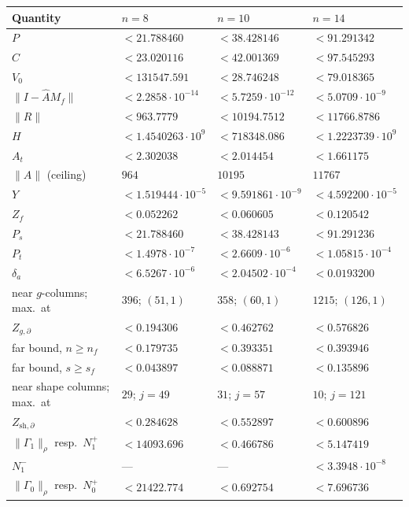 \documentclass[11pt]{amsart}
\theoremstyle{definition}
\theoremstyle{remark}
\numberwithin{equation}{section}
\newcommand{\nrm}[1]{\lVert #1\rVert}
\begin{document}
\begin{table}[tp]
\centering
\footnotesize
\begin{tabular}{@{}llll@{}}
\toprule
Quantity & $n=8$ & $n=10$ & $n=14$\\
\midrule
$P$ & $<21.788460$ & $<38.428146$ & $<91.291342$\\
$C$ & $<23.020116$ & $<42.001369$ & $<97.545293$\\
$V_0$ & $<131547.591$ & $<28.746248$ & $<79.018365$\\
$\nrm{I-\widehat AM_f}$ & $<2.2858\cdot10^{-14}$ & $<5.7259\cdot10^{-12}$ & $<5.0709\cdot10^{-9}$\\
$\nrm R$ & $<963.7779$ & $<10194.7512$ & $<11766.8786$\\
$H$ & $<1.4540263\cdot10^9$ & $<718348.086$ & $<1.2223739\cdot10^9$\\
$A_t$ & $<2.302038$ & $<2.014454$ & $<1.661175$\\
$\nrm A$ (ceiling) & $964$ & $10195$ & $11767$\\
\midrule
$Y$ & $<1.519444\cdot10^{-5}$ & $<9.591861\cdot10^{-9}$ & $<4.592200\cdot10^{-5}$\\
$Z_f$ & $<0.052262$ & $<0.060605$ & $<0.120542$\\
$P_s$ & $<21.788460$ & $<38.428143$ & $<91.291236$\\
$P_t$ & $<1.4978\cdot10^{-7}$ & $<2.6609\cdot10^{-6}$ & $<1.05815\cdot10^{-4}$\\
$\delta_a$ & $<6.5267\cdot10^{-6}$ & $<2.04502\cdot10^{-4}$ & $<0.0193200$\\
near $g$-columns; max.\ at & $396$; $(51,1)$ & $358$; $(60,1)$ & $1215$; $(126,1)$\\
$Z_{g,\partial}$ & $<0.194306$ & $<0.462762$ & $<0.576826$\\
far bound, $n\geq n_f$ & $<0.179735$ & $<0.393351$ & $<0.393946$\\
far bound, $s\geq s_f$ & $<0.043897$ & $<0.088871$ & $<0.135896$\\
near shape columns; max.\ at & $29$; $j=49$ & $31$; $j=57$ & $10$; $j=121$\\
$Z_{\mathrm{sh},\partial}$ & $<0.284628$ & $<0.552897$ & $<0.600896$\\
$\nrm{\Gamma_1}_\rho$ resp.\ $N_1^+$ & $<14093.696$ & $<0.466786$ & $<5.147419$\\
$N_1^-$ & --- & --- & $<3.3948\cdot10^{-8}$\\
$\nrm{\Gamma_0}_\rho$ resp.\ $N_0^+$ & $<21422.774$ & $<0.692754$ & $<7.696736$\\

\end{tabular}
\end{table}
\end{document}
